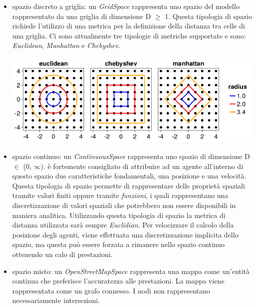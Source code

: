 \begin{itemize}
\begin{itemize}
        \item spazio discreto a griglia: un \emph{GridSpace} rappresenta uno spazio del modello
        rappresentato da una griglia di dimensione D $\geq$ 1. Questa tipologia di spazio 
        richiede l'utilizzo di una metrica per la definizione della distanza
        tra celle di una griglia. Ci sono attualmente tre tipologie di metriche supportate 
        e sono: \emph{Euclidean}, \emph{Manhattan} e \emph{Chebyshev}.

        \begin{minipage}{\linewidth}
            \centering
            \includegraphics[width=\textwidth]{img/distance.png}
            \label{fig:gridspace_distances}
        \end{minipage}
        
        \item spazio continuo: un \emph{ContinuousSpace} rappresenta uno spazio di dimensione
        D $\in$ (0, $\infty$). è fortemente consigliato di attribuire ad un agente all'interno 
        di questo spazio due caratteristiche fondamentali, una posizione e una velocità. Questa 
        tipologia di spazio permette di rappresentare delle proprietà spaziali tramite valori 
        finiti oppure tramite \emph{funzioni}, i quali rappresentano una discretizzazione di 
        valori spaziali che potrebbero non essere disponibili in maniera analitica. Utilizzando questa 
        tipologia di spazio la metrica di distanza utilizzata sarà sempre \emph{Euclidian}.
        Per velocizzare il calcolo della posizione degli agenti, viene effettuata una discretizzazione
        implicita dello spazio, ma questa può essere forzata a rimanere nello spazio continuo 
        ottenendo un calo di prestazioni.

        \item spazio misto: un \emph{OpenStreetMapSpace} rappresenta una mappa come un'entità 
        continua che preferisce l'accuratezza alle prestazioni. La mappa viene rappresentata 
        come un grafo connesso. I nodi non rappresentano necessariamente intersezioni. 
    \end{itemize}
\end{itemize} 


